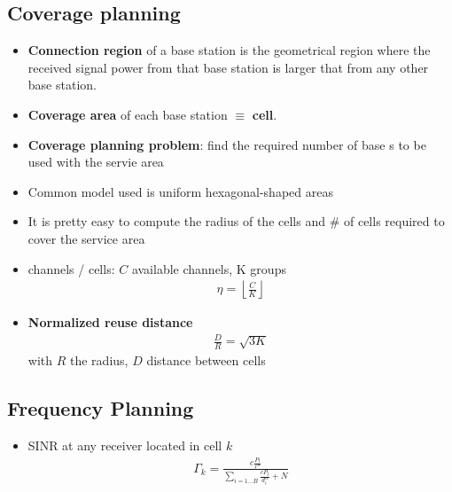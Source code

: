 \subsection{Coverage planning}
\begin{itemize}
	\item \textbf{Connection region} of a base station is the geometrical region where the received signal power from that base station is larger that from any other base station.
	\item \textbf{Coverage area} of each base station $\equiv$ \textbf{cell}.
	\item \textbf{Coverage planning problem}: find the required number of base s to be used with the servie area
	\item Common model used is uniform hexagonal-shaped areas
	\item It is pretty easy to compute the radius of the cells and \# of cells required to cover the service area
	\item channels / cells: $C$ available channels, K groups
	\begin{align*}
		\eta = \left \lfloor \frac{C}{K} \right \rfloor
	\end{align*}
	\item \textbf{Normalized reuse distance}
	\begin{align*}
		\frac{D}{R} = \sqrt{3K}
	\end{align*}
	with $R$ the radius, $D$ distance between cells
\end{itemize}
\subsection{Frequency Planning}
\begin{itemize}
	\item SINR at any receiver located in cell $k$
	\begin{align*}
		\Gamma_k = \frac{c \frac{P_t}{r^{\alpha}}}{\sum_{i=1...B} \frac{c P_t}{d^{\alpha}_i} + N}
	\end{align*}
\end{itemize}
